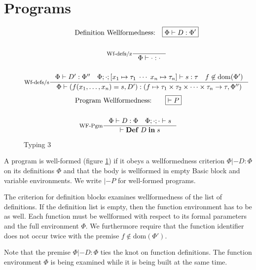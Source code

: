 \documentclass[a4paper, oneside, 10pt, draft]{memoir}
\begin{document}
\section{Programs}
\newcommand{\dom}[1]{\mathrm{dom}(#1)}
\begin{figure}
  \begin{gather*}
    \text{Definition Wellformedness:} \quad \boxed{\Phi |- D : \Phi'}\\\\
    \inference[Wf-defs/z]{}{\Phi |- \cdot : \cdot}\\\\
    \inference[Wf-defs/s]{\Phi |- D' : \Phi'' \quad \Phi;\cdot;[x_1 \mapsto
      \tau_1 \; \dotsb \; x_n \mapsto \tau_n] |- s :
      \tau \quad f \not \in \dom{\Phi'}}{\Phi |- (f(x_1, \dotsc, x_n) = s, D') : (f \mapsto \ntypes -> \tau, \Phi'')}
  \end{gather*}
  \begin{gather*}
    \text{Program Wellformedness:} \quad \quad \boxed{|- P}\\\\
    \inference[WF-Pgm]{\Phi |- D : \Phi \quad \Phi;\cdot;\cdot |- s}{|- \ipgm{D}{s}}
  \end{gather*}
  \caption{Typing 3}
  \label{fig:type-judgement-3}
\end{figure}

A program is well-formed (figure \ref{fig:type-judgement-3}) if it
obeys a wellformedness criterion $\boxed{\Phi |- D : \Phi}$ on its
definitions $\Phi$ and that the body is wellformed in empty Basic
block and variable environments. We write $\boxed{|- P}$ for
well-formed programs.

The criterion for definition blocks examines wellformedness of the
list of definitions. If the definition list is empty, then the
function environment has to be as well. Each function must be
wellformed with respect to its formal parameters and the full
environment $\Phi$. We furthermore require that the function identifier
does not occur twice with the premise $f \not \in \dom{\Phi'}$.

Note that the premise $\Phi |- D : \Phi$ ties the knot on function
definitions. The function environment $\Phi$ is being examined while it
is being built at the same time.

\end{document}
